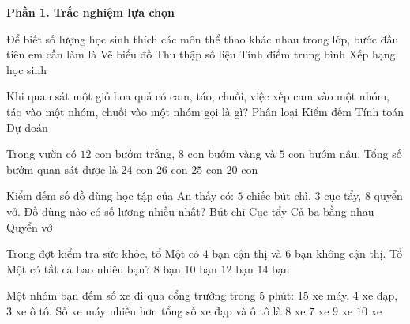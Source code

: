 \textbf{Phần 1. Trắc nghiệm lựa chọn}

\begin{ex} %
Để biết số lượng học sinh thích các môn thể thao khác nhau trong lớp, bước đầu tiên em cần làm là
\choice
{Vẽ biểu đồ}
{\True Thu thập số liệu}
{Tính điểm trung bình}
{Xếp hạng học sinh}
\end{ex}

\begin{ex} %
Khi quan sát một giỏ hoa quả có cam, táo, chuối, việc xếp cam vào một nhóm, táo vào một nhóm, chuối vào một nhóm gọi là gì?
\choice
{\True Phân loại}
{Kiểm đếm}
{Tính toán}
{Dự đoán}
\end{ex}

\begin{ex} %
Trong vườn có $12$ con bướm trắng, $8$ con bướm vàng và $5$ con bướm nâu. Tổng số bướm quan sát được là
\choice
{$24$ con}
{$26$ con}
{\True $25$ con}
{$20$ con}
\end{ex}

\begin{ex} %
Kiểm đếm số đồ dùng học tập của An thấy có: $5$ chiếc bút chì, $3$ cục tẩy, $8$ quyển vở. Đồ dùng nào có số lượng nhiều nhất?
\choice
{Bút chì}
{Cục tẩy}
{Cả ba bằng nhau}
{\True Quyển vở}
\end{ex}

\begin{ex} %
Trong đợt kiểm tra sức khỏe, tổ Một có $4$ bạn cận thị và $6$ bạn không cận thị. Tổ Một có tất cả bao nhiêu bạn?
\choice
{$8$ bạn}
{\True $10$ bạn}
{$12$ bạn}
{$14$ bạn}
\end{ex}

\begin{ex} %
Một nhóm bạn đếm số xe đi qua cổng trường trong 5 phút: 15 xe máy, 4 xe đạp, 3 xe ô tô. Số xe máy nhiều hơn tổng số xe đạp và ô tô là
\choice
{\True $8$ xe}
{$7$ xe}
{$9$ xe}
{$10$ xe}
\end{ex}

